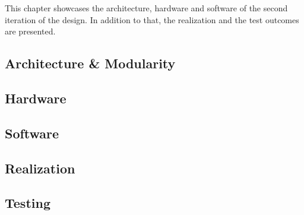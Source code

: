 \IEEEPARstart
{T}{his} chapter showcases the architecture, hardware and software
of the second iteration of the design. In addition to that, the 
realization and the test outcomes are presented.  

\subsection{Architecture \& Modularity}


\subsection{Hardware}


\subsection{Software}


\subsection{Realization}


\subsection{Testing}
